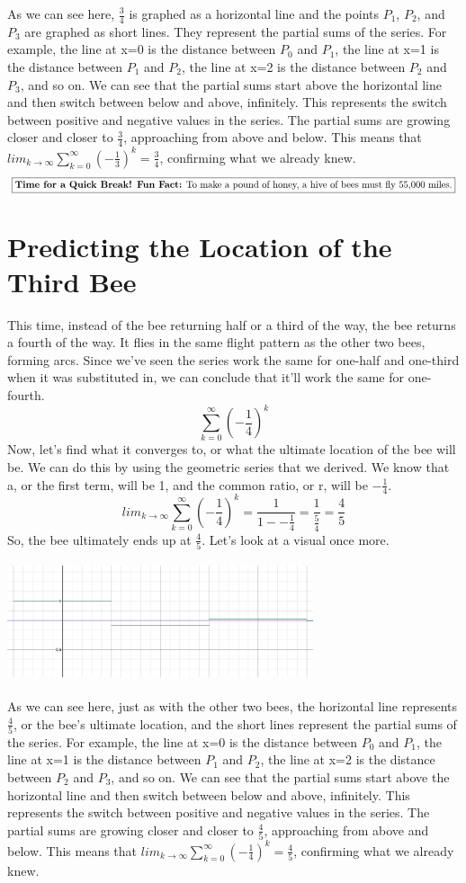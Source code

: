 \documentclass[a4paper,openright, 14pt]{article}
\begin{document}
As we can see here, $\frac{3}{4}$ is graphed as a horizontal line and the points $P_1$, $P_2$, and $P_3$ are graphed as short lines. They represent the partial sums of the series. For example, the line at x=0 is the distance between $P_0$ and $P_1$, the line at x=1 is the distance between $P_1$ and $P_2$, the line at x=2 is the distance between $P_2$ and $P_3$, and so on. We can see that the partial sums start above the horizontal line and then switch between below and above, infinitely. This represents the switch between positive and negative values in the series. The partial sums are growing closer and closer to $\frac{3}{4}$, approaching from above and below. This means that $lim_{k\to\infty}\sum\limits_{k=0}^{\infty} (-\frac{1}{3})^k=\frac{3}{4}$, confirming what we already knew. 
$$\fbox{\textbf{Time for a Quick Break! Fun Fact:} To make a pound of honey, a hive of bees must fly 55,000 miles.}$$
\section*{Predicting the Location of the Third Bee}
This time, instead of the bee returning half or a third of the way, the bee returns a fourth of the way. It flies in the same flight pattern as the other two bees, forming arcs. Since we've seen the series work the same for one-half and one-third when it was substituted in, we can conclude that it'll work the same for one-fourth. 
$$\sum\limits_{k=0}^{\infty} (-\frac{1}{4})^k$$
Now, let's find what it converges to, or what the ultimate location of the bee will be. We can do this by using the geometric series that we derived. We know that a, or the first term, will be 1, and the common ratio, or r, will be $-\frac{1}{4}$.
$$lim_{k\to\infty}\sum\limits_{k=0}^{\infty} (-\frac{1}{4})^k=\frac{1}{1--\frac{1}{4}}=\frac{1}{\frac{5}{4}}=\frac{4}{5}$$
So, the bee ultimately ends up at $\frac{4}{5}$. Let's look at a visual once more.
\begin{center}
    \includegraphics[width=9cm, height=3.5cm]{Images/line3.png}
\end{center}
As we can see here, just as with the other two bees, the horizontal line represents $\frac{4}{5}$, or the bee's ultimate location, and the short lines represent the partial sums of the series. For example, the line at x=0 is the distance between $P_0$ and $P_1$, the line at x=1 is the distance between $P_1$ and $P_2$, the line at x=2 is the distance between $P_2$ and $P_3$, and so on. We can see that the partial sums start above the horizontal line and then switch between below and above, infinitely. This represents the switch between positive and negative values in the series. The partial sums are growing closer and closer to $\frac{4}{5}$, approaching from above and below. This means that $lim_{k\to\infty}\sum\limits_{k=0}^{\infty} (-\frac{1}{4})^k=\frac{4}{5}$, confirming what we already knew.
\end{document}
